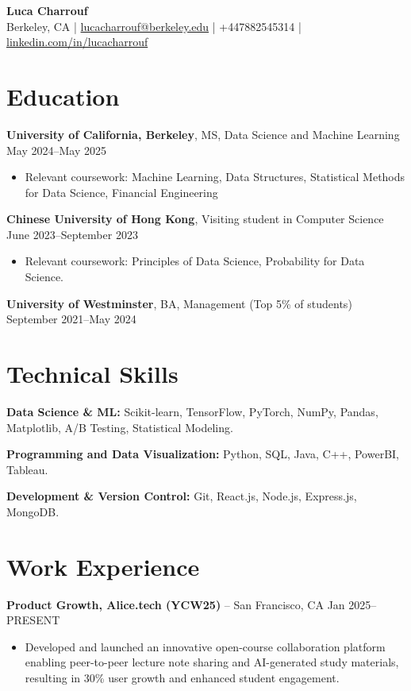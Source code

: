 \documentclass{article}
\begin{document}
\begin{center}
\Large\textbf{Luca Charrouf}\\
\vspace{0.25cm}
\normalsize
Berkeley, CA | \href{mailto:lucacharrouf@berkeley.edu}{lucacharrouf@berkeley.edu} | +447882545314 | \href{http://linkedin.com/in/lucacharrouf}{linkedin.com/in/lucacharrouf}
\end{center}

\section*{Education}
\textbf{University of California, Berkeley}, MS, Data Science and Machine Learning \hfill May 2024--May 2025
\begin{itemize}[leftmargin=*, noitemsep]
\item Relevant coursework: Machine Learning, Data Structures, Statistical Methods for Data Science, Financial Engineering
\end{itemize}

\textbf{Chinese University of Hong Kong}, Visiting student in Computer Science \hfill June 2023--September 2023
\begin{itemize}[leftmargin=*, noitemsep]
\item Relevant coursework: Principles of Data Science, Probability for Data Science.
\end{itemize}

\textbf{University of Westminster}, BA, Management (Top 5\% of students) \hfill September 2021--May 2024

\section*{Technical Skills}
\textbf{Data Science \& ML:} Scikit-learn, TensorFlow, PyTorch, NumPy, Pandas, Matplotlib, A/B Testing, Statistical Modeling.

\textbf{Programming and Data Visualization:} Python, SQL, Java, C++, PowerBI, Tableau.

\textbf{Development \& Version Control:} Git, React.js, Node.js, Express.js, MongoDB.

\section*{Work Experience}
\textbf{Product Growth, Alice.tech (YCW25)} -- San Francisco, CA \hfill Jan 2025--PRESENT
\begin{itemize}[leftmargin=*, noitemsep]
\item Developed and launched an innovative open-course collaboration platform enabling peer-to-peer lecture note sharing and AI-generated study materials, resulting in 30\% user growth and enhanced student engagement.
\end{itemize}
\end{document}
